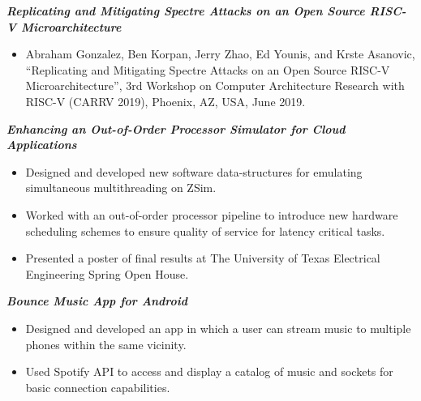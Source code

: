 \documentclass[letter]{res}
\begin{document}
\begin{resume}
\vspace{-2mm}

{\sl \textbf{Replicating and Mitigating Spectre Attacks on an Open Source RISC-V Microarchitecture}}\\

 \vspace{-4mm}

\begin{itemize}
 \item Abraham Gonzalez, Ben Korpan, Jerry Zhao, Ed Younis, and Krste Asanovic, ``Replicating and Mitigating Spectre Attacks on an Open Source RISC-V Microarchitecture'', 3rd Workshop on Computer Architecture Research with RISC-V (CARRV 2019), Phoenix, AZ, USA, June 2019.
\end{itemize}

\vspace{-2mm}

{\sl \textbf{Enhancing an Out-of-Order Processor Simulator for Cloud Applications}}\\

 \vspace{-4mm}

\begin{itemize}
 \item Designed and developed new software data-structures for emulating simultaneous multithreading on ZSim.
 \item Worked with an out-of-order processor pipeline to introduce new hardware scheduling schemes to ensure quality of service for latency critical tasks.
 \item Presented a poster of final results at The University of Texas Electrical Engineering Spring Open House.
\end{itemize}

\vspace{-2mm}

{\sl \textbf{Bounce Music App for Android}}\\

 \vspace{-4mm}

\begin{itemize}
 \item Designed and developed an app in which a user can stream music to multiple phones within the same vicinity.
 \item Used Spotify API to access and display a catalog of music and sockets for basic connection capabilities.
\end{itemize}


\end{resume}
\end{document}
